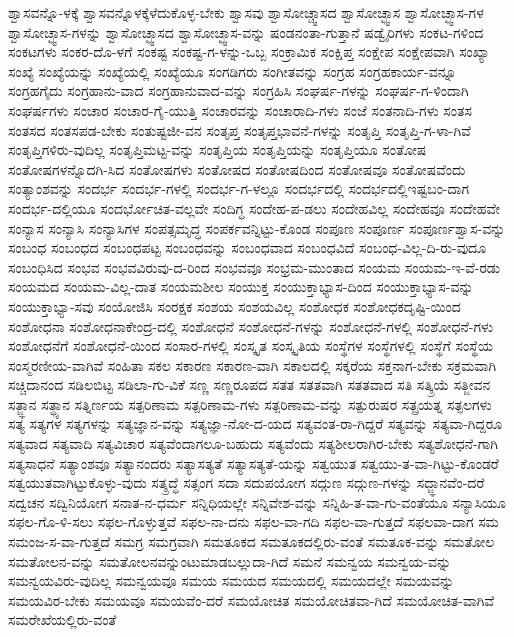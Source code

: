 {ಶ್ವಾಸವನ್ನೊ-ಳಕ್ಕೆ
ಶ್ವಾಸವನ್ನೊಳಕ್ಕೆಳೆದುಕೊಳ್ಳ-ಬೇಕು
ಶ್ವಾಸವು
ಶ್ವಾಸೋಚ್ಚ್ವಾಸದ
ಶ್ವಾಸೋಚ್ಛ್ವಾಸ
ಶ್ವಾಸೋಚ್ಛ್ವಾಸ-ಗಳ
ಶ್ವಾಸೋಚ್ಛ್ವಾಸ-ಗಳನ್ನು
ಶ್ವಾಸೋಚ್ಛ್ವಾಸದ
ಶ್ವಾಸೋಚ್ಛ್ವಾಸ-ವನ್ನು
ಷಂಡನಂತಾ-ಗುತ್ತಾನೆ
ಷಡ್ವೈರಿಗಳು
ಸಂಕಟ-ಗಳಿಂದ
ಸಂಕಟಗಳು
ಸಂಕರ-ದೊ-ಳಗೆ
ಸಂಕಷ್ಟ
ಸಂಕಷ್ಟ-ಗ-ಳನ್ನು-ಒಬ್ಬ
ಸಂಕ್ರಾಮಿಕ
ಸಂಕ್ಷಿಪ್ತ
ಸಂಕ್ಷೇಪ
ಸಂಕ್ಷೇಪವಾಗಿ
ಸಂಖ್ಯಾ
ಸಂಖ್ಯೆ
ಸಂಖ್ಯೆಯನ್ನು
ಸಂಖ್ಯೆಯಲ್ಲಿ
ಸಂಖ್ಯೆಯೂ
ಸಂಗಡಿಗರು
ಸಂಗೀತವನ್ನು
ಸಂಗ್ರಹ
ಸಂಗ್ರಹಕಾರ್ಯ-ವನ್ನೂ
ಸಂಗ್ರಹಗೈದು
ಸಂಗ್ರಹಾನು-ವಾದ
ಸಂಗ್ರಹಾನುವಾದ-ವನ್ನು
ಸಂಗ್ರಹಿಸಿ
ಸಂಘರ್ಷ-ಗಳನ್ನು
ಸಂಘರ್ಷ-ಗ-ಳಿಂದಾಗಿ
ಸಂಘರ್ಷಗಳು
ಸಂಚಾರ
ಸಂಚಾರ-ಗೈ-ಯುತ್ತಿ
ಸಂಚಾರವನ್ನು
ಸಂಚಾರಾದಿ-ಗಳು
ಸಂಜೆ
ಸಂತನಾದಿ-ಗಳು
ಸಂತಸ
ಸಂತಸದ
ಸಂತಸಪಡ-ಬೇಕು
ಸಂತುಷ್ಟಜೀ-ವನ
ಸಂತೃಪ್ತ
ಸಂತೃಪ್ತಭಾವನೆ-ಗಳನ್ನು
ಸಂತೃಪ್ತಿ
ಸಂತೃಪ್ತಿ-ಗ-ಳಾ-ಗಿವೆ
ಸಂತೃಪ್ತಿಗಳಿರು-ವುದಿಲ್ಲ
ಸಂತೃಪ್ತಿಮಟ್ಟ-ವನ್ನು
ಸಂತೃಪ್ತಿಯ
ಸಂತೃಪ್ತಿಯನ್ನು
ಸಂತೃಪ್ತಿಯೂ
ಸಂತೋಷ
ಸಂತೋಷಗಳನ್ನೊದಗಿ-ಸಿದ
ಸಂತೋಷಗಳು
ಸಂತೋಷದ
ಸಂತೋಷದಿಂದ
ಸಂತೋಷವೂ
ಸಂತೋಷವೆಂದು
ಸಂತ್ಯಾಂಶವನ್ನು
ಸಂದರ್ಭ
ಸಂದರ್ಭ-ಗಳಲ್ಲಿ
ಸಂದರ್ಭ-ಗ-ಳಲ್ಲೂ
ಸಂದರ್ಭದಲ್ಲಿ
ಸಂದರ್ಭದಲ್ಲಿಇಷ್ಟಬಂ-ದಾಗ
ಸಂದರ್ಭ-ದಲ್ಲಿಯೂ
ಸಂದರ್ಭೋಚಿತ-ವಲ್ಲವೇ
ಸಂದಿಗ್ಧ
ಸಂದೇಹ-ಪ-ಡಲು
ಸಂದೇಹವಿಲ್ಲ
ಸಂದೇಹವೂ
ಸಂದೇಹವೇ
ಸಂನ್ಯಾಸ
ಸಂನ್ಯಾಸಿ
ಸಂನ್ಯಾಸಿಗಳ
ಸಂಪತ್ಸಮೃದ್ಧ
ಸಂಪರ್ಕವನ್ನಿಟ್ಟು-ಕೊಂಡ
ಸಂಪೂಣ
ಸಂಪೂರ್ಣ
ಸಂಪೂರ್ಣಶ್ವಾಸ-ವನ್ನು
ಸಂಬಂಧ
ಸಂಬಂಧದ
ಸಂಬಂಧಪಟ್ಟ
ಸಂಬಂಧವನ್ನು
ಸಂಬಂಧವಾದ
ಸಂಬಂಧವಿದೆ
ಸಂಬಂಧ-ವಿಲ್ಲ-ದಿ-ರು-ವುದೂ
ಸಂಬಂಧಿಸಿದ
ಸಂಭವ
ಸಂಭವವಿರುವು-ದ-ರಿಂದ
ಸಂಭವವೂ
ಸಂಭ್ರಮ-ಮುಂತಾದ
ಸಂಯಮ
ಸಂಯಮ-ಇ-ವೆ-ರಡು
ಸಂಯಮದ
ಸಂಯಮ-ವಿಲ್ಲ-ದಾತ
ಸಂಯಮಶೀಲ
ಸಂಯುಕ್ತ
ಸಂಯುಕ್ತಾಭ್ಯಾಸ-ದಿಂದ
ಸಂಯುಕ್ತಾಭ್ಯಾಸ-ವನ್ನು
ಸಂಯುಕ್ತಾಭ್ಯಾ-ಸವು
ಸಂಯೋಜಿಸಿ
ಸಂರಕ್ಷಕ
ಸಂಶಯ
ಸಂಶಯವಿಲ್ಲ
ಸಂಶೋಧಕ
ಸಂಶೋಧಕದೃಷ್ಟಿ-ಯಿಂದ
ಸಂಶೋಧನಾ
ಸಂಶೋಧನಾಕೇಂದ್ರ-ದಲ್ಲಿ
ಸಂಶೋಧನೆ
ಸಂಶೋಧನೆ-ಗಳನ್ನು
ಸಂಶೋಧನೆ-ಗಳಲ್ಲಿ
ಸಂಶೋಧನೆ-ಗಳು
ಸಂಶೋಧನೆಗೆ
ಸಂಶೋಧನೆ-ಯಿಂದ
ಸಂಸಾರ-ಗಳಲ್ಲಿ
ಸಂಸ್ಕೃತ
ಸಂಸ್ಕೃತಿಯ
ಸಂಸ್ಥೆಗಳ
ಸಂಸ್ಥೆಗಳಲ್ಲಿ
ಸಂಸ್ಥೆಗೆ
ಸಂಸ್ಥೆಯ
ಸಂಸ್ಮರಣೀಯ-ವಾಗಿವೆ
ಸಂಹಿತಾ
ಸಕಲ
ಸಕಾರಣ
ಸಕಾರಣ-ವಾಗಿ
ಸಕಾಲದಲ್ಲಿ
ಸಕ್ಕರೆಯ
ಸಕ್ತನಾಗ-ಬೇಕು
ಸಕ್ರಮವಾಗಿ
ಸಚ್ಚಿದಾನಂದ
ಸಡಿಲಬಿಟ್ಟ
ಸಡಿಲಾ-ಗು-ವಿಕೆ
ಸಣ್ಣ
ಸಣ್ಣರೂಪದ
ಸತತ
ಸತತವಾಗಿ
ಸತತವಾದ
ಸತಿ
ಸತ್ಕ್ರಿಯೆ
ಸತ್ಜೀವನ
ಸತ್ಜ್ಞಾನ
ಸತ್ಧ್ಯಾನ
ಸತ್ನಿರ್ಣಯ
ಸತ್ಪರಿಣಾಮ
ಸತ್ಪರಿಣಾಮ-ಗಳು
ಸತ್ಪರಿಣಾಮ-ವನ್ನು
ಸತ್ಪುರುಷರ
ಸತ್ಪ್ರಯತ್ನ
ಸತ್ಫಲಗಳು
ಸತ್ಯ
ಸತ್ಯಗಳ
ಸತ್ಯಗಳನ್ನು
ಸತ್ಯಜ್ಞಾನ-ವನ್ನು
ಸತ್ಯಜ್ಞಾ-ನೋ-ದ-ಯದ
ಸತ್ಯವಂತ-ರಾ-ಗಿದ್ದರೆ
ಸತ್ಯವನ್ನು
ಸತ್ಯವಾ-ಗಿದ್ದರೂ
ಸತ್ಯವಾದ
ಸತ್ಯವಾದಿ
ಸತ್ಯವಿಚಾರ
ಸತ್ಯವೆಂದಾಗಲೂ-ಬಹುದು
ಸತ್ಯವೆಂದು
ಸತ್ಯಶೀಲರಾಗಿರ-ಬೇಕು
ಸತ್ಯಶೋಧನೆ-ಗಾಗಿ
ಸತ್ಯಸಾಧನೆ
ಸತ್ಯಾಂಶವೂ
ಸತ್ಯಾನಂದರು
ಸತ್ಯಾಸತ್ಯತೆ
ಸತ್ಯಾಸತ್ಯತೆ-ಯನ್ನು
ಸತ್ವಯುತ
ಸತ್ವಯು-ತ-ವಾ-ಗಿಟ್ಟು-ಕೊಂಡರೆ
ಸತ್ವಯುತವಾಗಿಟ್ಟುಕೊಳ್ಳು-ವುದು
ಸತ್ಶ್ರದ್ಧೆ
ಸತ್ಸಂಗ
ಸದಾ
ಸದುಪಯೋಗ
ಸದ್ಗುಣ
ಸದ್ಗುಣ-ಗಳನ್ನು
ಸದ್ಜ್ಞಾನವೆಂ-ದರೆ
ಸದ್ವಚನ
ಸದ್ವಿನಿಯೋಗ
ಸನಾತ-ನ-ಧರ್ಮ
ಸನ್ನಿಧಿಯಲ್ಲೇ
ಸನ್ನಿವೇಶ-ವನ್ನು
ಸನ್ನಿಹಿ-ತ-ವಾ-ಗು-ವಂತೆಯೂ
ಸನ್ಯಾಸಿಯೂ
ಸಫಲ-ಗೊ-ಳಿ-ಸಲು
ಸಫಲ-ಗೊಳ್ಳುತ್ತವೆ
ಸಫಲ-ನಾ-ದನು
ಸಫಲ-ವಾ-ಗದಿ
ಸಫಲ-ವಾ-ಗುತ್ತದೆ
ಸಫಲವಾ-ದಾಗ
ಸಮ
ಸಮಂಜ-ಸ-ವಾ-ಗುತ್ತದೆ
ಸಮಗ್ರ
ಸಮಗ್ರವಾಗಿ
ಸಮತೂಕದ
ಸಮತೂಕದಲ್ಲಿರು-ವಂತೆ
ಸಮತೂಕ-ವನ್ನು
ಸಮತೋಲ
ಸಮತೋಲನ-ವನ್ನು
ಸಮತೋಲನವನ್ನುಂಟುಮಾಡಬಲ್ಲುದಾ-ಗಿದೆ
ಸಮನೆ
ಸಮನ್ವಯ
ಸಮನ್ವಯ-ವನ್ನು
ಸಮನ್ವಯವಿರು-ವುದಿಲ್ಲ
ಸಮನ್ವಯವೂ
ಸಮಯ
ಸಮಯದ
ಸಮಯದಲ್ಲಿ
ಸಮಯದಲ್ಲೇ
ಸಮಯವನ್ನು
ಸಮಯವಿರ-ಬೇಕು
ಸಮಯವೂ
ಸಮಯವೆಂ-ದರೆ
ಸಮಯೋಚಿತ
ಸಮಯೋಚಿತವಾ-ಗಿದೆ
ಸಮಯೋಚಿತ-ವಾಗಿವೆ
ಸಮರೇಖೆಯಲ್ಲಿರು-ವಂತೆ
}
